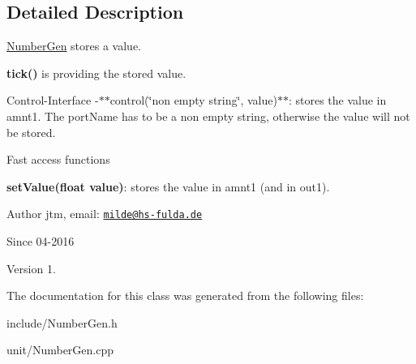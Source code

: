 \subsection{Detailed Description}
\hyperlink{classunit_1_1NumberGen}{Number\+Gen} stores a value.


\begin{DoxyItemize}
\item {\bfseries tick()} is providing the stored value.
\end{DoxyItemize}

Control-\/\+Interface -\/$\ast$$\ast$control(\char`\"{}non empty string\char`\"{}, value)$\ast$$\ast$\+: stores the value in amnt1. The port\+Name has to be a non empty string, otherwise the value will not be stored.

Fast access functions
\begin{DoxyItemize}
\item {\bfseries set\+Value(float value)}\+: stores the value in amnt1 (and in out1).
\end{DoxyItemize}

\begin{DoxyAuthor}{Author}
jtm, email\+:  \href{mailto:milde@hs-fulda.de}{\tt milde@hs-\/fulda.\+de} 
\end{DoxyAuthor}
\begin{DoxySince}{Since}
04-\/2016 
\end{DoxySince}
\begin{DoxyVersion}{Version}
1. 
\end{DoxyVersion}


The documentation for this class was generated from the following files\+:\begin{DoxyCompactItemize}
\item 
include/Number\+Gen.\+h\item 
unit/Number\+Gen.\+cpp\end{DoxyCompactItemize}
